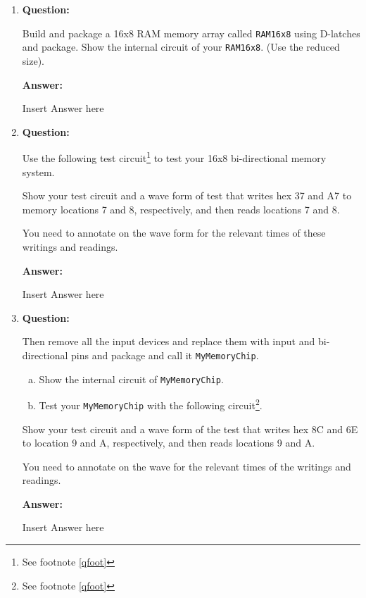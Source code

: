 \documentclass[11pt]{article}
\begin{document}
\begin{enumerate}
{	You need to use the quadruple 2-to-1 multiplexer you built in lab 4.
	\begin{enumerate}[(a)]
		\item {
			Build the {\tt UCT4-LD} and show the internal circuit of the counter.
		} \item {
			Build a circuit to test your {\tt UCT4-LD}.
			Show the test circuit and a wave form to demonstrate that
			\begin{enumerate}[i.]
				\item {
					The counter {\tt UCT4-LD} can increase the counter output from hex
					0 to 5, then load hex A to the counter, and then switch to the counting
					mode to count from A to F and then to 0.
				}
			\end{enumerate}
		}
	\end{enumerate}

	You need to annotate on the wave form for the time of each change.

	{\bf Answer:}

	Insert Answer here
}

\item{
	{\bf Question:}

	Build and package a 16x8 RAM memory array called {\tt RAM16x8}
	using D-latches and package.
	Show the internal circuit of your {\tt RAM16x8}. (Use the reduced size).

	{\bf Answer:}

	Insert Answer here
}

\item{
	{\bf Question:}

	Use the following test circuit\footnote{See footnote \ref{qfoot}} to test your 16x8 bi-directional memory system.

	Show your test circuit and a wave form of test that writes hex 37 and A7 to
	memory locations 7 and 8, respectively, and then reads locations 7 and 8.

	You need to annotate on the wave form for the relevant times of these writings
	and readings.

	{\bf Answer:}

	Insert Answer here
}

\item{
	{\bf Question:}

	Then remove all the input devices and replace them with input and bi-directional
	pins and package and call it {\tt MyMemoryChip}.
	\begin{enumerate}[(a)]
		\item {
			Show the internal circuit of {\tt MyMemoryChip}.
		} \item {
			Test your {\tt MyMemoryChip} with the following
			circuit\footnote{See footnote \ref{qfoot}}.
		}
	\end{enumerate}

	Show your test circuit and a wave form of the test that writes hex 8C and
	6E to location 9 and A, respectively, and then reads locations 9 and A.

	You need to annotate on the wave for the relevant times of the writings and
	readings.

	{\bf Answer:}

	Insert Answer here
}

\end{enumerate}
\end{document}
